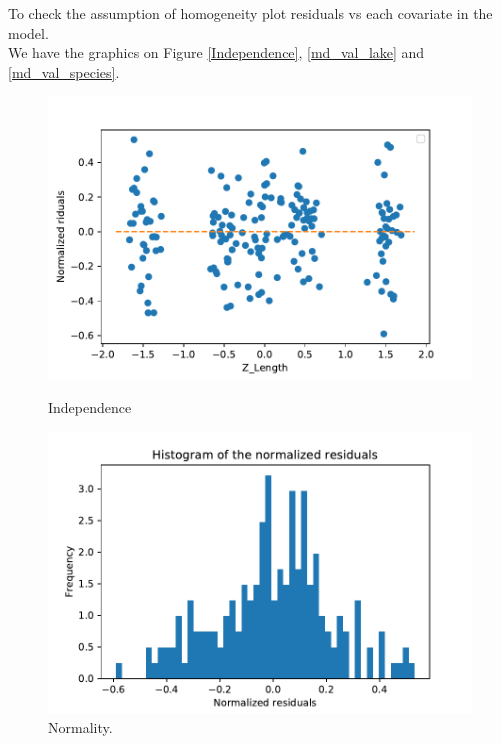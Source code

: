 \documentclass{article}
\begin{document}
To check the assumption of homogeneity plot residuals vs each covariate in the model.\\
We have the graphics on Figure \ref{Independence}, \ref{md_val_lake} and \ref{md_val_species}.
\begin{figure}[h!]
    \begin{minipage}[c]{0,4\textwidth}
    \centering
    \includegraphics[scale=0.6]{images/Model_validation_ind.pdf}
    \caption{Independence}
    \label{Independence}
    \end{minipage}
    \begin{minipage}[c]{0,9\textwidth}
    \centering
     \includegraphics[scale=0.6]{images/hist_check_normality.pdf}
    \caption{Normality.}
    \label{Normality}
    \end{minipage}
\end{figure}
\end{document}
